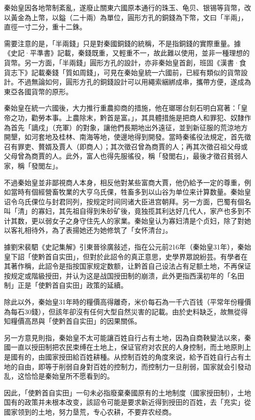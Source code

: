 秦始皇因各地幣制紊亂，遂廢止關東六國原本通行的珠玉、龟贝、银锡等貨幣，改以黃金為上幣，以鎰（二十兩）為單位，圓形方孔的銅錢為下幣，文曰「半兩」，直徑一寸二分，重十二銖。

需要注意的是，「半兩錢」只是對秦國銅錢的統稱，不是指銅錢的實際重量。據《史記·平準書》記載，秦錢既重，又輕重不一，故此難以使用，並非一種理想的貨幣。另一方面，「半兩錢」圓形方孔的設計，亦非秦始皇首創，班固《漢書·食貨志下》記載秦錢「質如周錢」，可見在秦始皇統一六國前，已經有類似的貨幣設計。不過無論如何，圓形方孔的銅錢設計可以用繩索綑綁成串，攜帶方便，遂成為東亞各國貨幣的原形。

秦始皇在統一六國後，大力推行重農抑商的措施，他在瑯琊台刻石明白寫著：「皇帝之功，勸勞本事。上農除末，黔首是富。」，其具體措施是把商人和罪犯、奴隸作為首先「謫戍」（充軍）的對象，讓他們長期地出外遠征，並到新征服的荒涼地方開墾，如河套地及桂林、南海等地，使邊地得到開發。當時秦徭役法規定，首先徵召有罪吏、贅婿及賈人（即商人）；其次徵召曾為商賈的人；再其次徵召祖父母或父母曾為商賈的人。此外，富人也得先服徭役，稱「發閭右」，最後才徵召貧弱人家，稱「發閭左」。

不過秦始皇並非鄙視商人本身，相反他對某些富商大賈，他仍給予一定的尊重，例如當時有個經營畜牧業的大亨乌氏倮，牲畜多到以山谷为单位来计算数量。秦始皇诏令乌氏倮位与封君同列，按规定时间同诸大臣进宫朝拜。另一方面，巴蜀有個名叫「清」的寡妇，其先祖自得到朱砂矿後，竟独揽其利达好几代人，家产也多到不计其数，更以弱女子之身守住先人的家業。秦始皇认为寡妇清是个贞妇，除了對她以客礼相待外，為了表揚她还为她修筑了「女怀清台」。

據劉宋裴駟《史記集解》引東晉徐廣敍述，指在公元前216年（秦始皇31年），秦始皇下詔「使黔首自实田」，但對於此詔令的真正意思，史學界眾說紛芸。有學者在其著作稱，此詔令是指按国家规定数额，让黔首自己设法占有足额土地，不再保证按规定或階級授田，并认为这是战国授田制的崩溃，此外更指西漢初年的「名田制」正是「使黔首自实田」政策的延續。

除此以外，秦始皇31年時的糧價高得離奇，米价每石為一千六百钱（平常年份糧價為每石30錢），但該年卻沒有任何大型自然災害的記載。由於史料缺乏，故無從得知糧價高昂與「使黔首自实田」的因果關係。

另一方意見則指，秦始皇不太可能讓百姓自行占有土地，因為自商鞅變法以來，秦國一直以授田制把农民束缚在土地上，保证官府对农民的人身控制，而土地原則上是國有的，由國家授田給百姓耕種。从控制百姓的角度來说，給予百姓自行占有土地的自由，即等于削弱自身對百姓的控制力，而控制力一旦削弱，国家就会引發动乱，这恰恰是秦始皇所不愿看到的。

因此，「使黔首自实田」一句未必指廢棄秦國原有的土地制度（國家授田制），土地国有的政策并未根本改变，該詔令可能是要求新近得到授田的百姓，去「充实」從國家领到的土地，努力垦荒，专心农耕，不要弃农经商。

